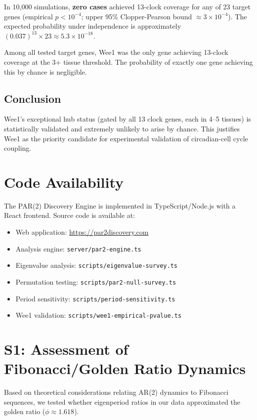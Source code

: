 \documentclass[11pt,a4paper]{article}
\begin{document}
In 10,000 simulations, \textbf{zero cases} achieved 13-clock coverage for any of 23 target genes (empirical $p < 10^{-4}$; upper 95\% Clopper-Pearson bound $\approx 3 \times 10^{-4}$). The expected probability under independence is approximately $(0.037)^{13} \times 23 \approx 5.3 \times 10^{-18}$.

Among all tested target genes, Wee1 was the only gene achieving 13-clock coverage at the 3+ tissue threshold. The probability of exactly one gene achieving this by chance is negligible.

\subsection{Conclusion}

Wee1's exceptional hub status (gated by all 13 clock genes, each in 4--5 tissues) is statistically validated and extremely unlikely to arise by chance. This justifies Wee1 as the priority candidate for experimental validation of circadian-cell cycle coupling.

\section{Code Availability}

The PAR(2) Discovery Engine is implemented in TypeScript/Node.js with a React frontend. Source code is available at:

\begin{itemize}
    \item Web application: \url{https://par2discovery.com}
    \item Analysis engine: \texttt{server/par2-engine.ts}
    \item Eigenvalue analysis: \texttt{scripts/eigenvalue-survey.ts}
    \item Permutation testing: \texttt{scripts/par2-null-survey.ts}
    \item Period sensitivity: \texttt{scripts/period-sensitivity.ts}
    \item Wee1 validation: \texttt{scripts/wee1-empirical-pvalue.ts}
\end{itemize}

\section{S1: Assessment of Fibonacci/Golden Ratio Dynamics}

Based on theoretical considerations relating AR(2) dynamics to Fibonacci sequences, we tested whether eigenperiod ratios in our data approximated the golden ratio ($\phi \approx 1.618$).
\end{document}
